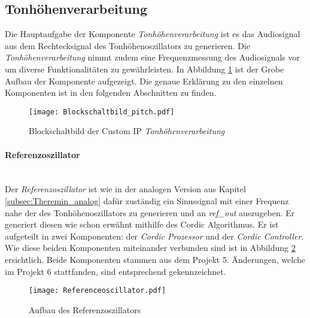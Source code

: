 \subsection{Tonhöhenverarbeitung}\label{subsec:Pitch_Generation}

Die Hauptaufgabe der Komponente \textit{Tonhöhenverarbeitung} ist es das Audiosignal aus dem Rechtecksignal des Tonhöhenoszillators zu generieren. Die \textit{Tonhöhenverarbeitung} nimmt zudem eine Frequenzmessung des Audiosignals vor um diverse Funktionalitäten zu gewährleisten. In Abbildung \ref{img:Blockschaltbild_pitch} ist der Grobe Aufbau der Komponente aufgezeigt. Die genaue Erklärung zu den einzelnen Komponenten ist in den folgenden Abschnitten zu finden.


\begin{figure}[h!]
	\centering
	\texttt{[image: Blockschaltbild\_pitch.pdf]}
	\caption{Blockschaltbild der Custom IP \textit{Tonhöhenverarbeitung}} 
	\label{img:Blockschaltbild_pitch}
\end{figure}  



\paragraph{Referenzoszillator}\mbox{}\\

Der \textit{Referenzoszillator} ist wie in der analogen Version aus Kapitel \ref{subsec:Theremin_analog} dafür zuständig ein Sinussignal mit einer Frequenz nahe der des Tonhöhenoszillators zu generieren und an \textit{ref\_out} auszugeben. Er generiert diesen wie schon erwähnt mithilfe des Cordic Algorithmus. Er ist aufgeteilt in zwei Komponenten: der \textit{Cordic Prozessor} und der \textit{Cordic Controller}. Wie diese beiden Komponenten miteinander verbunden sind ist in Abbildung \ref{img:Referenceoscillator} ersichtlich. Beide Komponenten stammen aus dem Projekt 5. Änderungen, welche im Projekt 6 stattfanden, sind entsprechend gekennzeichnet. \\

\begin{figure}[t]
	\centering
	\texttt{[image: Referenceoscillator.pdf]}
	\caption{Aufbau des Referenzoszillators} 
	\label{img:Referenceoscillator}
\end{figure}  

